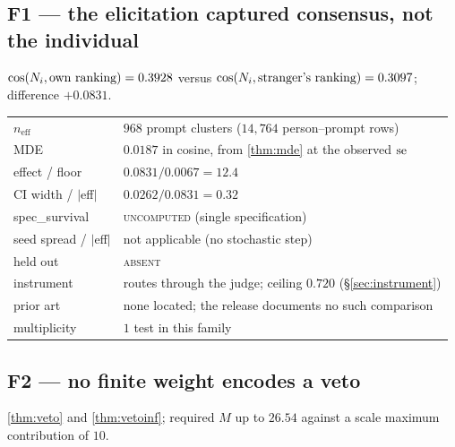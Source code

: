 \subsection{F1 --- the elicitation captured consensus, not the individual}

$\cos(N_i,\text{own ranking}) = 0.3928$ versus
$\cos(N_i,\text{stranger's ranking}) = 0.3097$; difference $+0.0831$.

\begin{table}[H]\centering\footnotesize
\begin{tabular}{ll}
\toprule
$n_{\text{eff}}$ & $968$ prompt clusters ($14{,}764$ person--prompt rows)\\
MDE & $0.0187$ in cosine, from \cref{thm:mde} at the observed $\operatorname{se}$\\
effect / floor & $0.0831 / 0.0067 = 12.4$\\
CI width / $|$eff$|$ & $0.0262/0.0831 = 0.32$\\
spec\_survival & \textsc{uncomputed} (single specification)\\
seed spread / $|$eff$|$ & not applicable (no stochastic step)\\
held out & \textsc{absent}\\
instrument & routes through the judge; ceiling $0.720$ (§\ref{sec:instrument})\\
prior art & none located; the release documents no such comparison\\
multiplicity & $1$ test in this family\\
\bottomrule
\end{tabular}
\end{table}

\subsection{F2 --- no finite weight encodes a veto}

\cref{thm:veto} and \cref{thm:vetoinf}; required $M$ up to $26.54$ against a scale
maximum contribution of $10$.


